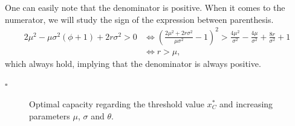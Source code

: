 One can easily note that the denominator is positive.
When it comes to the numerator, we will study the sign of the expression between parenthesis.
\begin{align}
2 \mu ^2-\mu  \sigma ^2 \left(\phi+1\right)+2 r \sigma ^2 >0 & \Leftrightarrow \left( \frac{2 \mu^2+2r \sigma^2}{\mu \sigma^2} -1 \right)^2 > \frac{4 \mu^2}{\sigma^2}-\frac{4 \mu}{\sigma^2}+\frac{8r}{\sigma^2}+1\\
& \Leftrightarrow r>\mu,
\end{align}
which always hold, implying that the denominator is always positive.

\begin{flushright}
	$\square$
\end{flushright}



\begin{figure}[!htb]
	\begin{subfigmatrix}{3}
	\end{subfigmatrix}
	\caption{Optimal capacity regarding the threshold value $x^*_C$ and increasing parameters $\mu$, $\sigma$ and $\theta$.}
	\label{fig:k1}
\end{figure}

